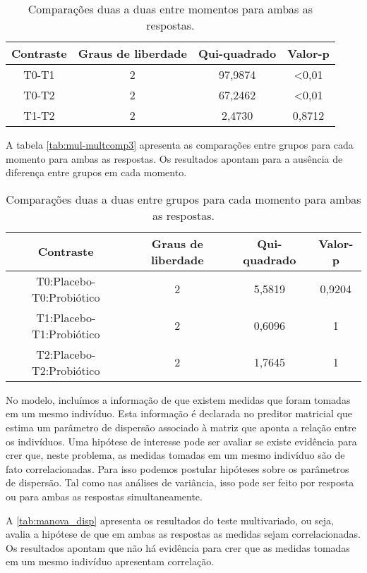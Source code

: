 \begin{table}[H]
\centering
\begin{tabular}{cccc}
\hline
Contraste & Graus de liberdade & Qui-quadrado & Valor-p        \\ \hline
T0-T1     & 2                  & 97,9874      & \textless 0,01 \\
T0-T2     & 2                  & 67,2462      & \textless 0,01 \\
T1-T2     & 2                  & 2,4730       & 0,8712         \\ \hline
\end{tabular}
\caption{Comparações duas a duas entre momentos para ambas as respostas.}
\label{tab:mul-multcomp1}
\end{table}

A tabela \autoref{tab:mul-multcomp3} apresenta as comparações entre grupos para cada momento para ambas as respostas. Os resultados apontam para a ausência de diferença entre grupos em cada momento.

\begin{table}[H]
\centering
\begin{tabular}{cccc}
\hline
Contraste                & Graus de liberdade & Qui-quadrado & Valor-p \\ \hline
T0:Placebo-T0:Probiótico & 2                  & 5,5819       & 0,9204  \\
T1:Placebo-T1:Probiótico & 2                  & 0,6096       & 1       \\
T2:Placebo-T2:Probiótico & 2                  & 1,7645       & 1       \\ \hline
\end{tabular}
\caption{Comparações duas a duas entre grupos para cada momento para ambas as respostas.}
\label{tab:mul-multcomp3}
\end{table}

No modelo, incluímos a informação de que existem medidas que foram tomadas em um mesmo indivíduo. Esta informação é declarada no preditor matricial que estima um parâmetro de dispersão associado à matriz que aponta a relação entre os indivíduos. Uma hipótese de interesse pode ser avaliar se existe evidência para crer que, neste problema, as medidas tomadas em um mesmo indivíduo são de fato correlacionadas. Para isso podemos postular hipóteses sobre os parâmetros de dispersão. Tal como nas análises de variância, isso pode ser feito por resposta ou para ambas as respostas simultaneamente.

A \autoref{tab:manova_disp} apresenta os resultados do teste multivariado, ou seja, avalia a hipótese de que em ambas as respostas as medidas sejam correlacionadas. Os resultados apontam que não há evidência para crer que as medidas tomadas em um mesmo indivíduo apresentam correlação.

